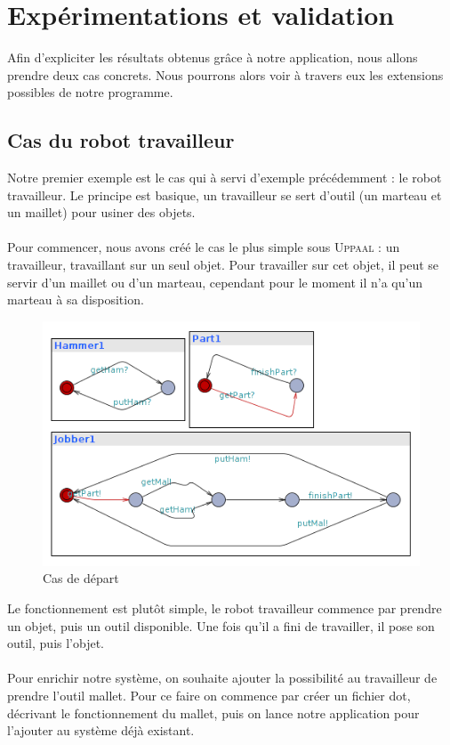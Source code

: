 \documentclass[12pt,a4paper]{report}
\begin{document}
\chapter{Expérimentations et validation}

    Afin d'expliciter les résultats obtenus grâce à notre application, nous allons 
    prendre deux cas concrets. Nous pourrons alors voir à travers eux les extensions 
    possibles de notre programme.
    
    \section{Cas du robot travailleur}
    
    Notre premier exemple est le cas qui à servi d'exemple précédemment : le robot travailleur.
    Le principe est basique, un travailleur se sert d'outil (un marteau et un maillet) 
    pour usiner des objets.
\\\\
    Pour commencer, nous avons créé le cas le plus simple sous \textsc{Uppaal} : un travailleur, 
    travaillant sur un seul objet. Pour travailler sur cet objet, il peut se servir 
    d'un maillet ou d'un marteau, cependant pour le moment il n'a qu'un marteau à sa 
    disposition.

\begin{figure}[H]
  \centering
  \includegraphics[scale=0.6]{ressources/workerBasic.png}
  \caption{Cas de départ}
\end{figure}

    Le fonctionnement est plutôt simple, le robot travailleur commence par prendre un objet, puis un outil disponible. Une fois qu'il a fini de travailler, il pose son outil, puis l'objet.
\\\\
    Pour enrichir notre système, on souhaite ajouter la possibilité au travailleur de prendre l'outil mallet. Pour ce faire on commence par créer un fichier dot, décrivant le fonctionnement du mallet, puis on lance notre application pour l'ajouter au système déjà existant.
    
\end{document}
